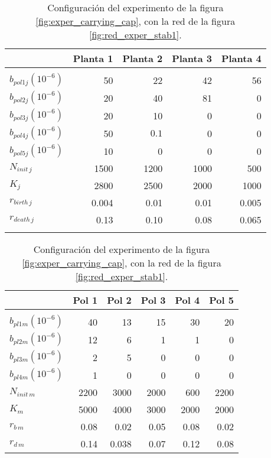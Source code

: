 \begin{table}[h!]
\centering
\normalsize
\caption{Configuración del experimento de la figura \ref{fig:exper_carrying_cap}, con la red de la figura \ref{fig:red_exper_stab1}.}
\footnotesize
\begin{tabular}{lrrrr}
\hline
 & Planta 1 & Planta 2 & Planta 3 & Planta 4  \\
\hline
\\
$b_{pol1j}\left(10^{-6}\right)$ & 50 & 22 & 42 & 56 \\
$b_{pol2j}\left(10^{-6}\right)$ & 20 & 40 & 81 & 0 \\
$b_{pol3j}\left(10^{-6}\right)$ & 20 & 10 & 0 & 0 \\
$b_{pol4j}\left(10^{-6}\right)$ & 50 & $0.1$ & 0 & 0 \\
$b_{pol5j}\left(10^{-6}\right)$ & 10 & 0 & 0 & 0 \\
$N_{init\,j}$ & 1500 & 1200 & 1000 & 500 \\
$K_{j}$ & 2800 & 2500 & 2000 & 1000 \\
$r_{birth\, j}$ & 0.004 & 0.01 & 0.01 & 0.005 \\
$r_{death\, j}$ & 0.13 & 0.10 & 0.08 & 0.065 \\

\hline
\\
\end{tabular}

\begin{tabular}{lrrrrr}
\hline
 &Pol 1&Pol 2&Pol 3&Pol 4&Pol 5\\
\hline
\\
$b_{pl1m}\left(10^{-6}\right)$ & 40 & 13 & 15 & 30 & 20\\
$b_{pl2m}\left(10^{-6}\right)$ & 12 & 6 & 1 & 1 & 0\\
$b_{pl3m}\left(10^{-6}\right)$ & 2 & 5 & 0 & 0 & 0\\
$b_{pl4m}\left(10^{-6}\right)$ & 1 & 0 & 0 & 0 & 0\\
$N_{init\,m}$ & 2200 & 3000 & 2000 & 600 & 2200 \\
$K_{m}$& 5000 & 4000 & 3000 & 2000 & 2000\\
$r_{b\, m}$ & 0.08 & 0.02 & 0.05 & 0.08 & 0.02 \\
$r_{d\, m}$ & 0.14 & 0.038 & 0.07 & 0.12 & 0.08 \\
\hline
\end{tabular}
\label{tab:experiment2}
\end{table}


